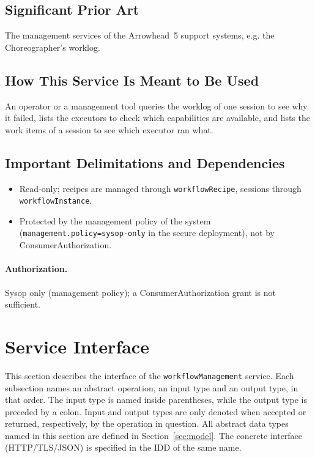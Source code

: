 \documentclass[a4paper]{arrowhead}
\begin{document}
\subsection{Significant Prior Art}
The management services of the Arrowhead~5 support systems, e.g. the Choreographer's worklog.

\subsection{How This Service Is Meant to Be Used}
An operator or a management tool queries the worklog of one session to see why it failed, lists the
executors to check which capabilities are available, and lists the work items of a session to see which executor ran
what.

\subsection{Important Delimitations and Dependencies}
\label{sec:delimitations}
\begin{itemize}
\item Read-only; recipes are managed through \texttt{workflowRecipe}, sessions through \texttt{workflowInstance}.
\item Protected by the management policy of the system (\texttt{management.policy=sysop-only} in the secure deployment), not by ConsumerAuthorization.
\end{itemize}

\paragraph{Authorization.} Sysop only (management policy); a ConsumerAuthorization grant is not sufficient.

\newpage
\section{Service Interface}
\label{sec:operations}
This section describes the interface of the \texttt{workflowManagement} service. Each subsection names an abstract operation,
an input type and an output type, in that order. The input type is named inside parentheses, while the output type is
preceded by a colon. Input and output types are only denoted when accepted or returned, respectively, by the operation
in question. All abstract data types named in this section are defined in Section~\ref{sec:model}. The concrete
interface (HTTP/TLS/JSON) is specified in the IDD of the same name.
\end{document}
